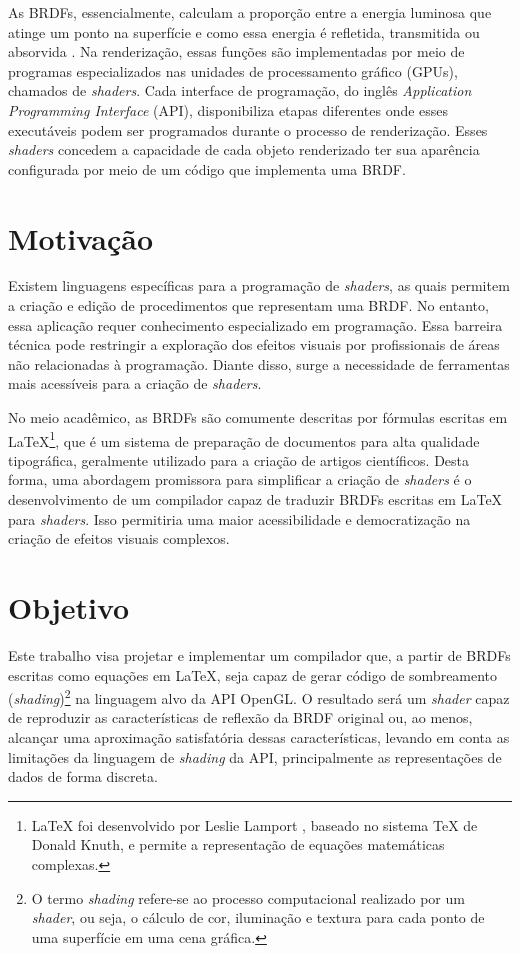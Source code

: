 \documentclass[english,
               brazil,
               bsc] %
               {dcomp-abntex2}
\begin{document}
As BRDFs, essencialmente, calculam a proporção entre a energia luminosa que atinge um ponto na superfície e como essa energia é refletida, transmitida ou absorvida \cite{pbr}. Na renderização, essas funções são implementadas por meio de programas especializados nas unidades de processamento gráfico (GPUs), chamados de \textit{shaders}. Cada interface de programação, do inglês \textit{ Application Programming Interface} (API),  disponibiliza etapas diferentes onde esses executáveis podem ser programados durante o processo de renderização. Esses \textit{shaders} concedem a capacidade de cada objeto renderizado ter sua aparência configurada por meio de um código que implementa uma BRDF.




\section{Motivação}




Existem linguagens específicas para a programação de \textit{shaders}, as quais permitem a criação e edição de procedimentos que representam uma BRDF. No entanto, essa aplicação requer conhecimento especializado em programação. Essa barreira técnica pode restringir a exploração dos efeitos visuais por profissionais de áreas não relacionadas à programação. Diante disso, surge a necessidade de ferramentas mais acessíveis para a criação de \textit{shaders}.


No meio acadêmico, as BRDFs são comumente descritas por fórmulas escritas em \LaTeX{}\footnote{\LaTeX{} foi desenvolvido por Leslie Lamport \cite{leslie1994latex}, baseado no sistema \TeX{} de Donald Knuth, e permite a representação de equações matemáticas complexas.}, que é um sistema de preparação de documentos para alta qualidade tipográfica, geralmente utilizado para a criação de artigos científicos. Desta forma, uma abordagem promissora para simplificar a criação de \textit{shaders} é o desenvolvimento de um compilador capaz de traduzir BRDFs   escritas em \LaTeX{} para \textit{shaders}. Isso permitiria uma maior acessibilidade e democratização na criação de efeitos visuais complexos.


\section{Objetivo}
Este trabalho visa projetar e implementar um compilador que, a partir de BRDFs escritas como equações em \LaTeX{}, seja capaz de gerar código de sombreamento (\textit{shading})\footnote{O termo \textit{shading} refere-se ao processo computacional realizado por um \textit{shader}, ou seja, o cálculo de cor, iluminação e textura para cada ponto de uma superfície em uma cena gráfica.} na linguagem alvo da API OpenGL. O resultado será um \textit{shader} capaz de reproduzir as características de reflexão da BRDF original ou, ao menos, alcançar uma aproximação satisfatória dessas características, levando em conta as limitações da linguagem de \textit{shading} da API, principalmente as representações de dados de forma discreta.
\end{document}

